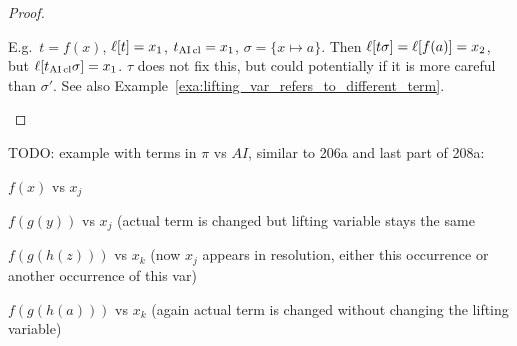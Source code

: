 \documentclass[,%
	paper=a4,%
	DIV12, %
	twoside=false,%
	liststotoc,
	bibtotoc,
	draft=false,%
	numbers=noendperiod
]{scrartcl}
\begin{document}
\begin{proof}
\begin{itemize}
\begin{compactitem}
{					E.g.\ $t = f(x)$, $\ell[t] = x_1$, $t_{\operatorname{AI}\mathrm{cl}} = x_1$, $\sigma = \{x\mapsto a\}$. 
					Then $\ell[t\sigma] = \ell[f(a)] = x_2$, but $\ell[t_{\operatorname{AI}\mathrm{cl}}\sigma] = x_1$.
					$\tau$ does not fix this, but could potentially if it is more careful than $\sigma'$.
					See also Example~\ref{exa:lifting_var_refers_to_different_term}.
				}

				\end{compactitem}
	\end{itemize}
\end{proof}

\begin{exa}
	TODO: example with terms in $\pi$ vs $AI$, similar to 206a and last part of 208a:

	$f(x)$ vs $ x_j $

	$f(g(y))$ vs $ x_j $ (actual term is changed but lifting variable stays the same

	$f(g(h(z)))$ vs $ x_k $ (now $x_j$ appears in resolution, either this occurrence or another occurrence of this var)

	$f(g(h(a)))$ vs $ x_k $ (again actual term is changed without changing the lifting variable)
\end{exa}
\end{document}

